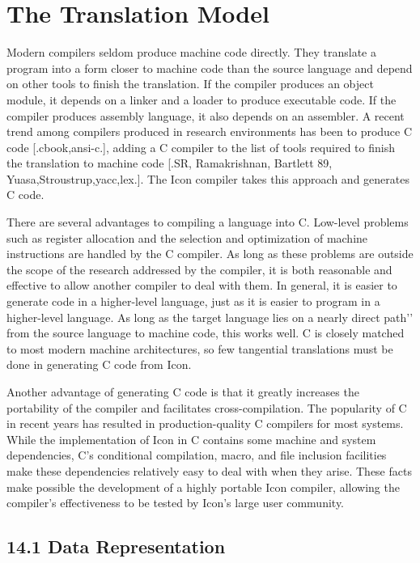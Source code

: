 \clearpage\chapter{The Translation Model}

Modern compilers seldom produce machine code directly. They translate
a program into a form closer to machine code than the source language
and depend on other tools to finish the translation. If the compiler
produces an object module, it depends on a linker and a loader to
produce executable code. If the compiler produces assembly language,
it also depends on an assembler. A recent trend among compilers
produced in research environments has been to produce C code
[.cbook,ansi-c.], adding a C compiler to the list of tools required to
finish the translation to machine code [.SR, Ramakrishnan, Bartlett
89, Yuasa,Stroustrup,yacc,lex.]. The Icon compiler takes this approach
and generates C code.


There are several advantages to compiling a language into C. Low-level
problems such as register allocation and the selection and
optimization of machine instructions are handled by the C compiler. As
long as these problems are outside the scope of the research addressed
by the compiler, it is both reasonable and effective to allow another
compiler to deal with them. In general, it is easier to generate code
in a higher-level language, just as it is easier to program in a
higher-level language. As long as the target language lies on a
{\textasciigrave}{\textasciigrave}nearly direct path'{}' from the
source language to machine code, this works well. C is closely matched
to most modern machine architectures, so few tangential translations
must be done in generating C code from Icon.


Another advantage of generating C code is that it greatly increases
the portability of the compiler and facilitates cross-compilation. The
popularity of C in recent years has resulted in production-quality C
compilers for most systems.  While the implementation of Icon in C
contains some machine and system dependencies, C's conditional
compilation, macro, and file inclusion facilities make these
dependencies relatively easy to deal with when they arise. These facts
make possible the development of a highly portable Icon compiler,
allowing the compiler's effectiveness to be tested by Icon's large
user community.

\section[14.1 Data Representation]{14.1 Data Representation}


